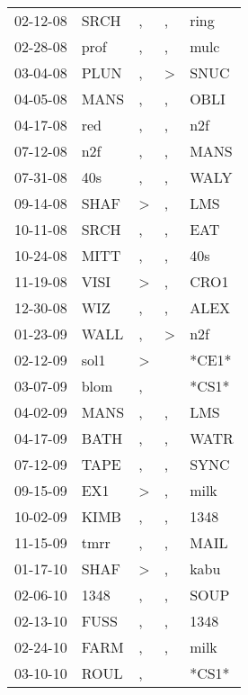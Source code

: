 \begin{supertabular}{lllll}
 02-12-08 &   SRCH &             , &             , &   ring \\
 02-28-08 &   prof &             , &             , &   mulc \\
 03-04-08 &   PLUN &             , &  \textgreater &   SNUC \\
 04-05-08 &   MANS &             , &             , &   OBLI \\
 04-17-08 &    red &             , &             , &    n2f \\
 07-12-08 &    n2f &             , &             , &   MANS \\
 07-31-08 &    40s &             , &             , &   WALY \\
 09-14-08 &   SHAF &  \textgreater &             , &    LMS \\
 10-11-08 &   SRCH &             , &             , &    EAT \\
 10-24-08 &   MITT &             , &             , &    40s \\
 11-19-08 &   VISI &  \textgreater &             , &   CRO1 \\
 12-30-08 &    WIZ &             , &             , &   ALEX \\
 01-23-09 &   WALL &             , &  \textgreater &    n2f \\
 02-12-09 &   sol1 &  \textgreater &               &  *CE1* \\
 03-07-09 &   blom &             , &               &  *CS1* \\
 04-02-09 &   MANS &             , &             , &    LMS \\
 04-17-09 &   BATH &             , &             , &   WATR \\
 07-12-09 &   TAPE &             , &             , &   SYNC \\
 09-15-09 &    EX1 &  \textgreater &             , &   milk \\
 10-02-09 &   KIMB &             , &             , &   1348 \\
 11-15-09 &   tmrr &             , &             , &   MAIL \\
 01-17-10 &   SHAF &  \textgreater &             , &   kabu \\
 02-06-10 &   1348 &             , &             , &   SOUP \\
 02-13-10 &   FUSS &             , &             , &   1348 \\
 02-24-10 &   FARM &             , &             , &   milk \\
 03-10-10 &   ROUL &             , &               &  *CS1* \\

\end{supertabular}
